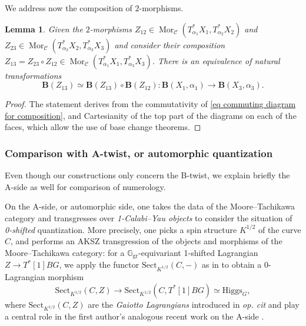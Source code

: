 \documentclass[11pt, a4paper]{amsart}
\numberwithin{equation}{section}
\newtheorem{lemma}[theorem]{Lemma}
\theoremstyle{definition}
\theoremstyle{remark}
\DeclareMathOperator{\Mor}{Mor}
\newcommand{\Cc}{\mathcal{C}}
\newcommand{\Ggr}{\mathbb{G}_{\mathrm{gr}}}
\newcommand{\bB}{\mathbf{B}}
\renewcommand{\to}{\longrightarrow}
\begin{document}

We address now the composition of $2$-morphisms.

\begin{lemma}
Given the $2$-morphisms $Z_{12} \in \Mor_{\Cc}(T^*_{\alpha_1} X_1, T^*_{\alpha_2} X_2)$ and $Z_{23} \in \Mor_{\Cc}(T^*_{\alpha_2} X_2, T^*_{\alpha_3} X_3)$ and consider their composition $Z_{13} = Z_{23} \circ Z_{12} \in \Mor_{\Cc}(T^*_{\alpha_1} X_1, T^*_{\alpha_3} X_3)$. There is an equivalence of natural transformations
    $$\bB(Z_{13}) \simeq \bB(Z_{13}) \circ \bB(Z_{12}): \bB(X_1,\alpha_1) \to \bB(X_3,\alpha_3).$$
\end{lemma}
\begin{proof}
The statement derives from the commutativity of \eqref{eq commuting diagram for composition}, and Cartesianity of the top part of the diagrams on each of the faces, which allow the use of base change theorems.   
\end{proof}


\subsubsection{Comparison with A-twist, or automorphic quantization}\label{subsubsection automorphic quantization}

Even though our constructions only concern the B-twist, we explain briefly the A-side as well for comparison of numerology. 

On the A-side, or automorphic side, one takes the data of the Moore--Tachikawa category and transgresses over \textit{1-Calabi--Yau objects} to consider the situation of \textit{0-shifted} quantization. More precisely, one picks a spin structure $K^{1/2}$ of the curve $C$, and performs an AKSZ transgression of the objects and morphisms of the Moore--Tachikawa category: for a $\Ggr$-equivariant 1-shifted Lagrangian $Z \to T^*[1]BG$, we apply the functor $\mathrm{Sect}_{K^{1/2}}(C, -)$ as in \cite{ginzburg&rozenblyum} to obtain a 0-Lagrangian morphism
\begin{equation}\label{equation Gaiotto Lagrangian}
    \mathrm{Sect}_{K^{1/2}}(C, Z) \longrightarrow \mathrm{Sect}_{K^{1/2}}(C, T^*[1]BG) \simeq \mathrm{Higgs}_G,
\end{equation}
where $\mathrm{Sect}_{K^{1/2}}(C, Z)$ are the \textit{Gaiotto Lagrangians} introduced in \textit{op. cit} and play a central role in the first author's analogous recent work on the A-side \cite{CHY}. 
\end{document}
